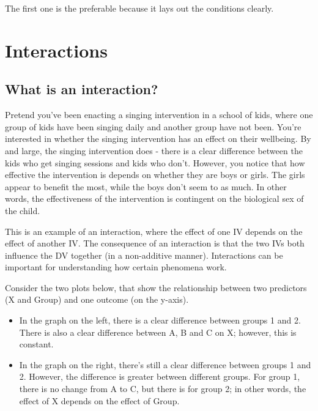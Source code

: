 \documentclass[
]{book}
\providecommand{\tightlist}{%
  \setlength{\itemsep}{0pt}\setlength{\parskip}{0pt}}
\begin{document}
The first one is the preferable because it lays out the conditions clearly.

\section{Interactions}\label{interactions}

\subsection{What is an interaction?}\label{what-is-an-interaction}

Pretend you've been enacting a singing intervention in a school of kids, where one group of kids have been singing daily and another group have not been. You're interested in whether the singing intervention has an effect on their wellbeing. By and large, the singing intervention does - there is a clear difference between the kids who get singing sessions and kids who don't. However, you notice that how effective the intervention is depends on whether they are boys or girls. The girls appear to benefit the most, while the boys don't seem to as much. In other words, the effectiveness of the intervention is contingent on the biological sex of the child.

This is an example of an interaction, where the effect of one IV depends on the effect of another IV. The consequence of an interaction is that the two IVs both influence the DV together (in a non-additive manner). Interactions can be important for understanding how certain phenomena work.

Consider the two plots below, that show the relationship between two predictors (X and Group) and one outcome (on the y-axis).

\begin{itemize}
\tightlist
\item
  In the graph on the left, there is a clear difference between groups 1 and 2. There is also a clear difference between A, B and C on X; however, this is constant.
\item
  In the graph on the right, there's still a clear difference between groups 1 and 2. However, the difference is greater between different groups. For group 1, there is no change from A to C, but there is for group 2; in other words, the effect of X depends on the effect of Group.
\end{itemize}


\end{document}
